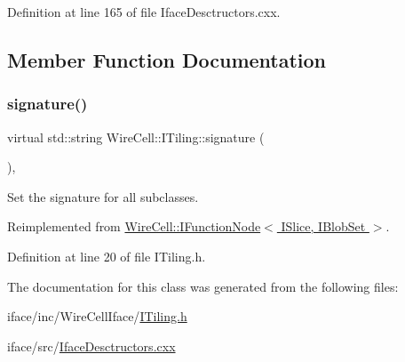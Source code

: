 Definition at line 165 of file Iface\+Desctructors.\+cxx.



\subsection{Member Function Documentation}
\mbox{\label{class_wire_cell_1_1_i_tiling_a6ee9a22c6c5b01b5b56d343e5b69a243}} 
\subsubsection{\texorpdfstring{signature()}{signature()}}
{\footnotesize\ttfamily virtual std\+::string Wire\+Cell\+::\+I\+Tiling\+::signature (\begin{DoxyParamCaption}{ }\end{DoxyParamCaption})\hspace{0.3cm}{\ttfamily [inline]}, {\ttfamily [virtual]}}



Set the signature for all subclasses. 



Reimplemented from \hyperlink{class_wire_cell_1_1_i_function_node_af59f46cf19ca9fdf4aade1f289feedf2}{Wire\+Cell\+::\+I\+Function\+Node$<$ I\+Slice, I\+Blob\+Set $>$}.



Definition at line 20 of file I\+Tiling.\+h.



The documentation for this class was generated from the following files\+:\begin{DoxyCompactItemize}
\item 
iface/inc/\+Wire\+Cell\+Iface/\hyperlink{_i_tiling_8h}{I\+Tiling.\+h}\item 
iface/src/\hyperlink{_iface_desctructors_8cxx}{Iface\+Desctructors.\+cxx}\end{DoxyCompactItemize}
